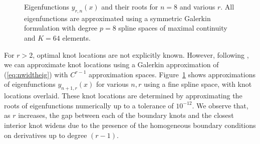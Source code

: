 \documentclass[preprint,10pt]{elsarticle}
\newcommand{\reviewerOne}[1]{#1}
\begin{document}
\begin{figure}
\centering
{}
\hspace{.5em}
\hspace{.5em}
\caption{Eigenfunctions $y_{r,n}(x)$ and their roots for $n = 8$ and various $r$.  All eigenfunctions are approximated using a symmetric Galerkin formulation with degree $p = 8$ spline spaces of maximal continuity and $K = 64$ elements. }
\label{fig:eigoptknots}
\end{figure}

For $r > 2$, optimal knot locations are not explicitly known.  However, following \cite{evans2009n}, we can approximate knot locations using a Galerkin approximation of (\ref{eq:nwidtheig}) with $C^{r-1}$ approximation spaces.  Figure~\ref{fig:eigoptknots} shows approximations of eigenfunctions $y_{n+1,r}(x)$ for various $n,r$ using a fine spline space, with knot locations overlaid.  These knot locations are determined by approximating the roots of eigenfunctions numerically up to a tolerance of $10^{-12}$.  We observe that, as $r$ increases, 
\reviewerOne{the gap between each of the boundary knots and the closest interior knot widens}
due to the presence of the homogeneous boundary conditions on derivatives up to degree $(r-1)$.  
\end{document}
